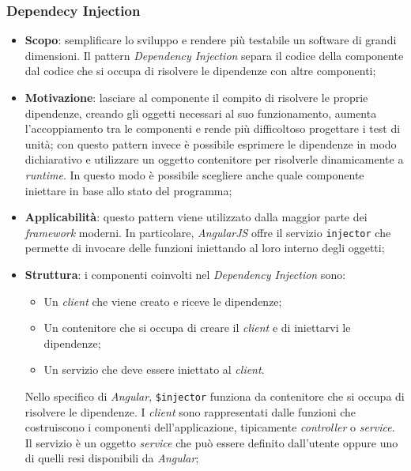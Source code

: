\subsubsection{Dependecy Injection}
\begin{itemize}

\item \textbf{Scopo}: semplificare lo sviluppo e rendere più testabile un software di grandi dimensioni. Il pattern \textit{Dependency Injection} separa il codice della componente dal codice che si occupa di risolvere le dipendenze con altre componenti;

\item \textbf{Motivazione}: lasciare al componente il compito di risolvere le proprie dipendenze, creando gli oggetti necessari al suo funzionamento, aumenta l'accoppiamento tra le componenti e rende più difficoltoso progettare i test di unità; con questo pattern invece è possibile esprimere le dipendenze in modo dichiarativo e utilizzare un oggetto contenitore per risolverle dinamicamente a \textit{runtime}. In questo modo è possibile scegliere anche quale componente iniettare in base allo stato del programma;

\item \textbf{Applicabilità}: questo pattern viene utilizzato dalla maggior parte dei \textit{framework} moderni. In particolare, \textit{AngularJS} offre il servizio
\texttt{injector} che permette di invocare delle funzioni iniettando al loro interno degli oggetti;

\item \textbf{Struttura}: i componenti coinvolti nel \textit{Dependency Injection} sono:
	\begin{itemize}
		\item Un \textit{client} che viene creato e riceve le dipendenze;
		\item Un contenitore che si occupa di creare il \textit{client} e di iniettarvi le dipendenze;
		\item Un servizio che deve essere iniettato al \textit{client}.
	\end{itemize}
Nello specifico di \textit{Angular}, \texttt{\$injector} funziona da contenitore che si occupa di risolvere le dipendenze. I \textit{client} sono rappresentati dalle funzioni che costruiscono i componenti dell'applicazione, tipicamente \textit{controller} o \textit{service}. Il servizio è un oggetto \textit{service} che può essere definito dall'utente oppure uno di quelli resi disponibili da \textit{Angular};


\end{itemize}
